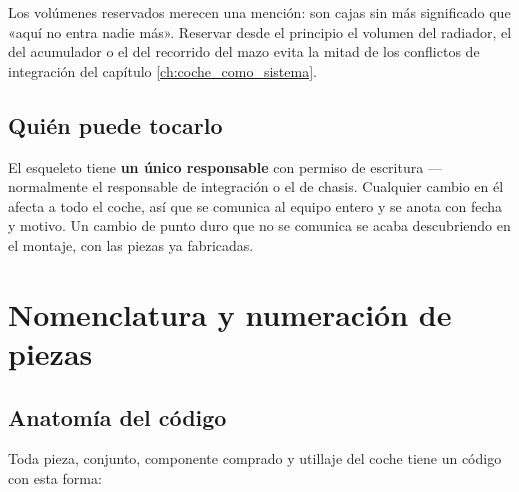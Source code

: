 Los volúmenes reservados merecen una mención: son cajas sin más significado que
«aquí no entra nadie más». Reservar desde el principio el volumen del radiador,
el del acumulador o el del recorrido del mazo evita la mitad de los conflictos
de integración del capítulo \ref{ch:coche_como_sistema}.

\subsection{Quién puede tocarlo}

El esqueleto tiene \textbf{un único responsable} con permiso de escritura ---
normalmente el responsable de integración o el de chasis. Cualquier cambio en él
afecta a todo el coche, así que se comunica al equipo entero y se anota con
fecha y motivo. Un cambio de punto duro que no se comunica se acaba descubriendo
en el montaje, con las piezas ya fabricadas.

\section{Nomenclatura y numeración de piezas}
\label{sec:herramientas_cad_datos:03}

\subsection{Anatomía del código}

Toda pieza, conjunto, componente comprado y utillaje del coche tiene un código
con esta forma:

